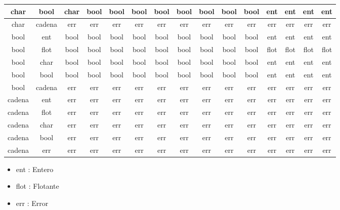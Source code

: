 \begin{table}
\begin{tabular}{||c c || c c c c c c c c c c c c c||}
         \hline
         char & bool & char & bool & bool & bool & bool & bool & bool & bool & bool & ent & ent & ent & ent \\ 
         \hline
         char & cadena & err & err & err & err & err & err & err & err & err & err & err & err & err \\ 
         \hline
         bool & ent & bool & bool & bool & bool & bool & bool & bool & bool & bool & ent & ent & ent & ent \\ 
         \hline
         bool & flot & bool & bool & bool & bool & bool & bool & bool & bool & bool & flot & flot & flot & flot \\ 
         \hline
         bool & char & bool & bool & bool & bool & bool & bool & bool & bool & bool & ent & ent & ent & ent \\ 
         \hline
         bool & bool & bool & bool & bool & bool & bool & bool & bool & bool & bool & ent & ent & ent & ent \\ 
         \hline
         bool & cadena & err & err & err & err & err & err & err & err & err & err & err & err & err \\ 
         \hline
         cadena & ent & err & err & err & err & err & err & err & err & err & err & err & err & err \\ 
         \hline
         cadena & flot & err & err & err & err & err & err & err & err & err & err & err & err & err \\ 
         \hline
         cadena & char & err & err & err & err & err & err & err & err & err & err & err & err & err \\ 
         \hline
         cadena & bool & err & err & err & err & err & err & err & err & err & err & err & err & err \\ 
         \hline
         cadena & err & err & err & err & err & err & err & err & err & err & err & err & err & err \\ 
        
         
        
        \end{tabular}
        \begin{itemize}
            \item ent : Entero
            \item flot : Flotante
            \item err : Error
        \end{itemize}
    
\end{table}
\FloatBarrier

